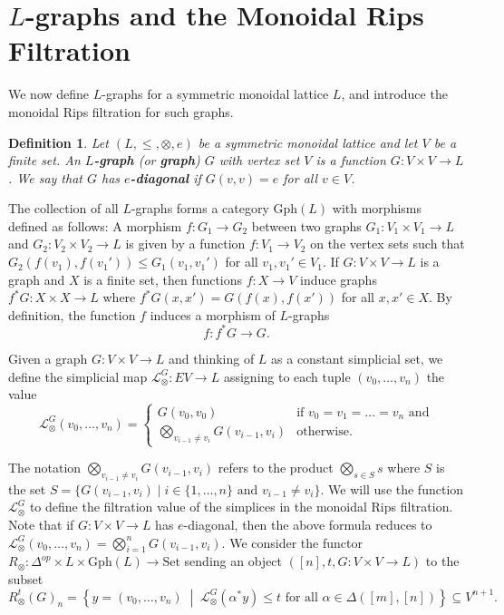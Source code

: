 \documentclass[a4paper,11pt]{article}
\newcommand{\Set}{\mathrm{Set}}
\newcommand{\Gph}{\mathrm{Gph}}
\newcommand{\tensor}{\otimes}
\newcommand{\bigtensor}{\bigotimes}
\newcounter{dummy}\numberwithin{dummy}{section}
\newtheorem{definition}[dummy]{Definition}
\theoremstyle{remark}
\begin{document}
\section{\texorpdfstring{$L$}{L}-graphs and the Monoidal Rips Filtration}\label{sec:graphs_and_the_monoidal_rips_filtration}

We now define $L$-graphs for a symmetric monoidal lattice $L$, and introduce the monoidal Rips filtration for such graphs.

\begin{definition}
Let $(L, \leq, \tensor, e)$ be a symmetric monoidal lattice and let $V$ be a finite set. An \textbf{$L$-graph} (or \textbf{graph}) $G$ with vertex set $V$ is a function $G\colon V\times V\to L$. We say that $G$ has \textbf{$e$-diagonal} if $G(v,v)=e$ for all $v\in V$.
\end{definition}
The collection of all $L$-graphs forms a category $\Gph(L)$ with morphisms defined as follows: A morphism $f\colon G_1\to G_2$ between two graphs $G_1\colon V_1\times V_1\to L$ and $G_2\colon V_2\times V_2\to L$ is given by a function $f\colon V_1\to V_2$ on the vertex sets such that $G_2(f(v_1), f(v_1'))\leq G_1(v_1,v_1')$ for all $v_1,v_1'\in V_1$. If $G\colon V\times V\to L$ is a graph and $X$ is a finite set, then functions $f\colon X\to V$ induce graphs $f^*G\colon X\times X\to L$ where $f^*G(x,x')=G(f(x),f(x'))$ for all $x,x'\in X$. By definition, the function $f$ induces a morphism of $L$-graphs
\begin{equation}\label{eq: f_induced_on_f*G}
    f:f^*G\to G.
\end{equation}


Given a graph $G\colon V\times V\to L$ and thinking of $L$ as a constant simplicial set, we define the simplicial map $\mathcal{L}_\tensor^G\colon EV\to L$ assigning to each tuple $(v_0,\ldots, v_n)$ the value
\begin{equation*}
    \mathcal{L}_\tensor^G(v_0,\ldots, v_n) =
    \begin{cases}
        G(v_0,v_0) &\text{if } v_0=v_1=\dots=v_n\text{ and}\\
        \bigtensor_{v_{i-1}\neq v_{i}}G(v_{i-1},v_{i})&  \text{otherwise.}
    \end{cases}
\end{equation*}

The notation $\bigtensor_{v_{i-1}\neq v_{i}}G(v_{i-1},v_{i})$ refers to the product $\bigtensor_{s\in S}s$ where $S$ is the set $S=\{G(v_{i-1},v_i)\mid i\in\{1,\ldots,n\}\text{ and } v_{i-1}\neq v_i\}$. We will use the function $\mathcal{L}_\tensor^G$ to define the filtration value of the simplices in the monoidal Rips filtration. Note that if $G\colon V\times V\to L$ has $e$-diagonal, then the above formula reduces to $\mathcal{L}^G_\tensor(v_0,\ldots,v_n)=\bigtensor_{i=1}^nG(v_{i-1},v_i)$. We consider the functor $R_\tensor\colon \Delta^{op}\times L\times \Gph(L)\to \Set$ sending an object $([n],t,G\colon V\times V\to L)$ to the subset
\begin{equation*}
    R^t_\tensor(G)_n = \left\{y=(v_0,\dots,v_n) \;\middle|\; \mathcal{L}^G_\tensor(\alpha^*y)\leq t \text{ for all }\alpha\in\Delta([m],[n])\right\}\subseteq V^{n+1}.
\end{equation*}
\end{document}
